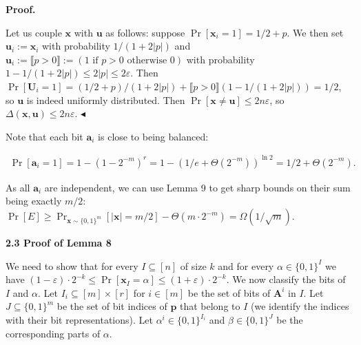\documentclass[10pt,a4paper]{article}
\begin{document}



\par\medskip\noindent\textbf{Proof.}\par




Let us couple $\bm{x}$ with $\bm{u}$ as follows:
suppose $\Pr[\bm{x}_{i}=1]=1/2+p$. We then set $\bm{u}_{i}:=\bm{x}_{i}$ with
probability $1/(1+2|p|)$ and $\bm{u}_{i}:=\llbracket p>0\rrbracket:=(1\text{ if }p>0\text{ otherwise }0)$
with probability $1-1/(1+2|p|)\leq 2|p|\leq 2\varepsilon$.
Then $\Pr[\bm{U}_{i}=1]=(1/2+p)/(1+2|p|)+\llbracket p>0\rrbracket(1-1/(1+2|p|))=1/2$, so $\bm{u}$ is indeed uniformly distributed.
Then $\Pr[\bm{x}\neq\bm{u}]\leq 2n\varepsilon$, so $\Delta(\bm{x},\bm{u})\leq 2n\varepsilon$.
$\blacktriangleleft$\par




Note that each bit $\bm{a}_{i}$ is close to being balanced:\par


\[\begin{gathered}
\Pr[\bm{a}_{i}=1]=1-(1-2^{-m})^{r}=1-(1/e+\Theta(2^{-m}))^{\ln 2}=1/2+\Theta(2^{-m}).
\end{gathered}\]


As all $\bm{a}_{i}$ are independent, we can use Lemma 9 to get sharp bounds on their sum being exactly $m/2$: $\Pr[E]\geq\Pr_{\bm{x}\sim\{0,1\}^{m}}[|\bm{x}|=m/2]-\Theta(m\cdot 2^{-m})=\Omega(1/\sqrt{m})$.\par






\par\medskip\noindent\textbf{
2.3 Proof of Lemma 8
}\par




We need to show that for every $I\subseteq[n]$ of size $k$ and for every $\alpha\in\{0,1\}^{I}$ we
have $(1-\varepsilon)\cdot 2^{-k}\leq\Pr[\bm{x}_{I}=\alpha]\leq(1+\varepsilon)\cdot 2^{-k}$. We
now classify the bits of $I$ and $\alpha$. Let $I_{i}\subseteq[m]\times[r]$ for $i\in[m]$ be the set
of bits of $\bm{A}^{i}$ in $I$. Let $J\subseteq\{0,1\}^{m}$ be the set of bit indices of $\bm{p}$ that
belong to $I$ (we identify the indices with their bit representations). Let $\alpha^{i}\in\{0,1\}^{I_{i}}$
and $\beta\in\{0,1\}^{J}$ be the corresponding parts of $\alpha$.\par
\end{document}
